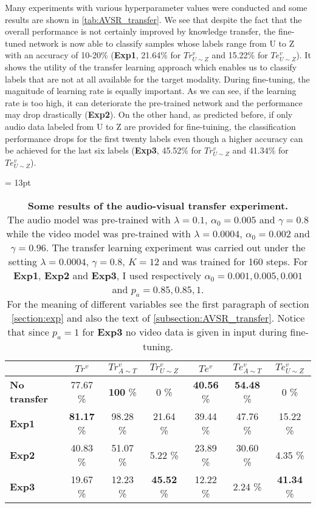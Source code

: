 Many experiments with various hyperparameter values were conducted
and some results are shown in \autoref{tab:AVSR_transfer}.
We see that despite the fact that the overall performance is not certainly
improved by knowledge transfer,
the fine-tuned network is now able to classify
samples whose labels range from U to Z with an accuracy of 10-20\%
(\textbf{Exp1}, 21.64\% for $Tr_{U\sim Z}^v$ and 15.22\% for
$Te_{U\sim Z}^v$). It shows the utility of the transfer learning approach
which enables us to classify labels that are not at all available
for the target modality.
During fine-tuning, the magnitude of learning rate is equally important.
As we can see, if the learning rate is too high, it can deteriorate
the pre-trained network and the performance may drop drastically
(\textbf{Exp2}).
On the other hand, as predicted before, if only audio data labeled from
U to Z are provided for fine-tuining, the classification performance
drops for the first twenty labels even though a higher accuracy
can be achieved for the last six labels (\textbf{Exp3}, 45.52\% for
$Tr_{U\sim Z}^v$ and 41.34\% for $Te_{U\sim Z}^v$).

\begin{table}[H]
  \tabcolsep = 13pt
  \caption{\textbf{Some results of the audio-visual transfer experiment.}
    \\[0.1em]
  The audio model was pre-trained with $\lambda=0.1$, $\alpha_0=0.005$ and
  $\gamma=0.8$ while the video model was pre-trained with $\lambda=0.0004$,
  $\alpha_0=0.002$ and $\gamma=0.96$. The transfer learning experiment
  was carried out under the setting $\lambda=0.0004$, $\gamma=0.8$, $K=12$
  and was trained for 160 steps.
  For \textbf{Exp1}, \textbf{Exp2} and \textbf{Exp3}, I used respectively
  $\alpha_0 = 0.001, 0.005, 0.001$ and $p_a = 0.85, 0.85, 1$.\\[0.1em]
  For the meaning of different variables see the first paragraph of
  section \ref{section:exp} and also the text of
  \ref{subsection:AVSR_transfer}.
  Notice that since $p_a = 1$ for \textbf{Exp3} no video data is given
  in input during fine-tuning.
  }
  \label{tab:AVSR_transfer}
  \begin{tabular*}{\linewidth}{>{\bf}lcccccc}
    \toprule
    & $Tr^v$ & $Tr^v_{A\sim T}$ & $Tr^v_{U\sim Z}$
    & $Te^v$ & $Te^v_{A\sim T}$ & $Te^v_{U\sim Z}$\\
    \midrule
    No transfer & 77.67 \% & \textbf{100} \% & 0 \% & \textbf{40.56} \%
    & \textbf{54.48} \% & 0 \% \\
    Exp1 & \textbf{81.17} \% & 98.28 \% & 21.64 \% & 39.44 \%
    & 47.76 \% & 15.22 \% \\
    Exp2 &  40.83 \% & 51.07 \% & 5.22 \% & 23.89 \%
    & 30.60 \% & 4.35 \% \\
    Exp3 & 19.67 \% & 12.23 \% & \textbf{45.52} \% & 12.22 \%
    & 2.24 \% & \textbf{41.34} \% \\
    \bottomrule
  \end{tabular*}
\end{table}
\vspace{-1em}

